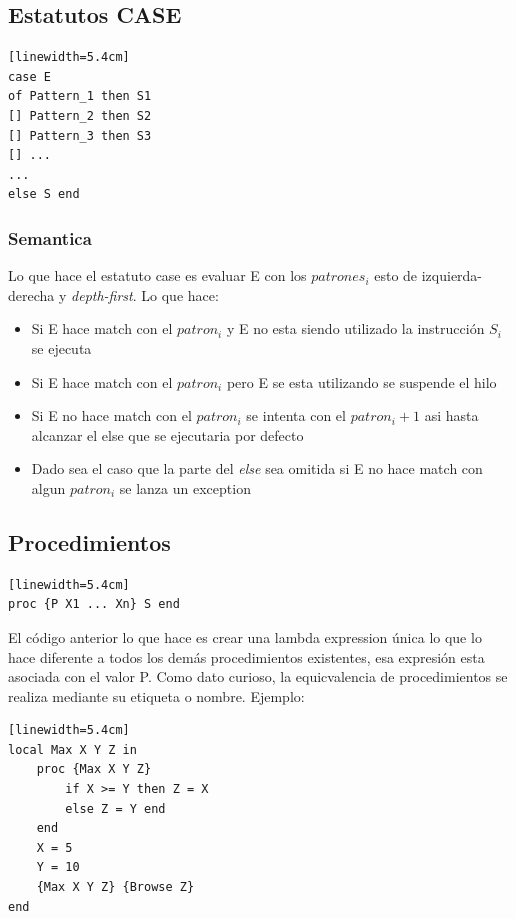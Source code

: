 \documentclass[10pt,journal,compsoc]{IEEEtran}
\begin{document}
\subsection{Estatutos CASE}
\begin{lstlisting}[language=Oz, caption = {Variables en un scope}][linewidth=5.4cm]
case E 
of Pattern_1 then S1 
[] Pattern_2 then S2 
[] Pattern_3 then S3
[] ...
...
else S end
\end{lstlisting}
\subsubsection{Semantica}
Lo que hace el estatuto case es evaluar E con los $patrones_i$ esto de izquierda-derecha y \emph{depth-first}. Lo que hace:
\begin{itemize}
	\item Si E hace match con el $patron_i$ y E no esta siendo utilizado la instrucci\'on $S_i$ se ejecuta
	\item Si E hace match con el $patron_i$ pero E se esta utilizando se suspende el hilo
	\item Si E no hace match con el $patron_i$ se intenta con el $patron_i+1$ asi hasta alcanzar el else que se ejecutaria por defecto
	\item Dado sea el caso que la parte del \emph{else} sea omitida si E no hace match con algun $patron_i$ se lanza un exception
\end{itemize}

\subsection{Procedimientos}
\begin{lstlisting}[language=Oz, caption = {Variables en un scope}][linewidth=5.4cm]
proc {P X1 ... Xn} S end
\end{lstlisting}
El c\'odigo anterior lo que hace es crear una lambda expression \'unica lo que lo hace diferente a todos los dem\'as procedimientos existentes, esa expresi\'on esta asociada con el valor P. Como dato curioso, la equicvalencia de procedimientos se realiza mediante su etiqueta o nombre. Ejemplo:
\begin{lstlisting}[language=Oz, caption = {Obtener el mayor entre dos n\'umeros}][linewidth=5.4cm]
local Max X Y Z in 
	proc {Max X Y Z}
		if X >= Y then Z = X 
		else Z = Y end 
	end 
	X = 5
	Y = 10
	{Max X Y Z} {Browse Z}
end
\end{lstlisting}
\end{document}
